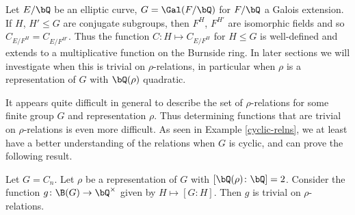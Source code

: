 \begin{example}
Let $E / \bQ$ be an elliptic curve, $G = \Gal(F / \bQ)$ for $F / \bQ$ a Galois extension. If $H$, $H' \leq G$ are conjugate subgroups, then $F^{H}$, $F^{H'}$ are isomorphic fields and so $C_{E / F^H} = C_{E/ F^{H'}}$. Thus the function $C \colon H \mapsto C_{E / F^H}$ for $H \leq G$ is well-defined and extends to a multiplicative function on the Burnside ring. In later sections we will investigate when this is trivial on $\rho$-relations, in particular when $\rho$ is a representation of $G$ with $\bQ(\rho)$ quadratic. 
\end{example}

It appears quite difficult in general to describe the set of $\rho$-relations for some finite group $G$ and representation $\rho$. Thus determining functions that are trivial on $\rho$-relations is even more difficult. As seen in Example \ref{cyclic-relns}, we at least have a better understanding of the relations when $G$ is cyclic, and can prove the following result.

\begin{prop}\label{index-fn-trivial}
    Let $G = C_n$. Let $\rho$ be a representation of $G$ with $[\bQ(\rho) \colon \bQ] = 2$. Consider the function $g \colon \B(G) \to \bQ^{\times}$ given by $H \mapsto [G : H]$. Then $g$ is trivial on $\rho$-relations.
\end{prop}

